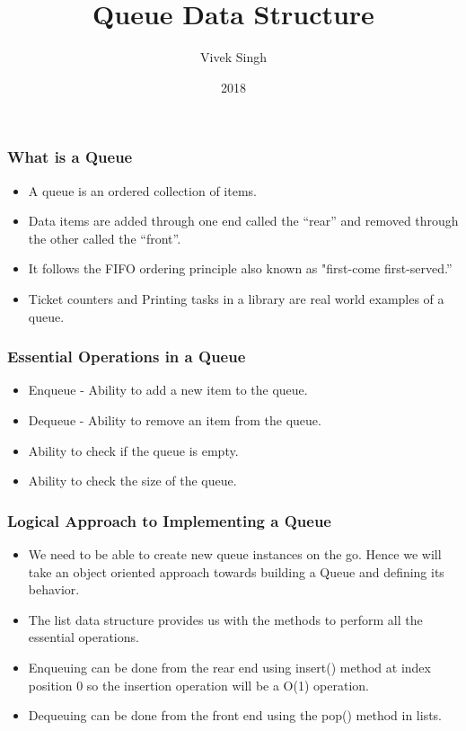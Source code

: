 \documentclass{beamer}
\title{Queue Data Structure}
\author{Vivek Singh}
\institute{Information Systems Decision Sciences (ISDS)\\
MUMA College of Business\\
University of South Florida \\
Tampa, Florida}
\date{2018}
\begin{document}
 
\frame{\titlepage}
 
\begin{frame}
\frametitle{What is a Queue}
\begin{itemize}

\item A queue is an ordered collection of items.

\item Data items are added through one end called the “rear” and removed through the other called the “front”.


\item It follows the FIFO ordering principle also known as "first-come first-served.”
 

\item Ticket counters and Printing tasks in a library are real world examples of a queue.


\end{itemize}
\end{frame}


\begin{frame}
\frametitle{Essential Operations in a Queue}
\begin{itemize}

\item Enqueue - Ability to add a new item to the queue.

\item Dequeue - Ability to remove an item from the queue.

\item Ability to check if the queue is empty.

\item Ability to check the size of the queue.


\end{itemize}
\end{frame}

\begin{frame}
\frametitle{Logical Approach to Implementing a Queue}
\begin{itemize}

\item We need to be able to create new queue instances on the go. Hence we will take an object oriented approach towards building a Queue and defining its behavior.

\item The list data structure provides us with the methods to perform all the essential operations.

\item Enqueuing can be done from the rear end using insert() method at index position 0 so the insertion operation will be a O(1) operation.

\item Dequeuing can be done from the front end using the pop() method in lists.

\end{itemize}
\end{frame}
\end{document}
